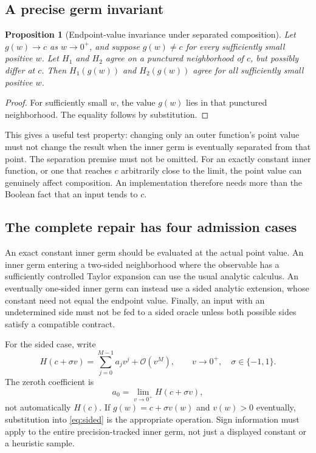 \documentclass[11pt,letterpaper]{article}
\newcommand{\OO}{\mathcal{O}}
\newtheorem{proposition}{Proposition}[section]
\begin{document}
\subsection{A precise germ invariant}
\begin{proposition}[Endpoint-value invariance under separated composition]
Let $g(w)\to c$ as $w\to0^+$, and suppose $g(w)\ne c$ for every sufficiently
small positive $w$. Let $H_1$ and $H_2$ agree on a punctured neighborhood of $c$,
but possibly differ at $c$. Then $H_1(g(w))$ and $H_2(g(w))$ agree for all
sufficiently small positive $w$.
\end{proposition}
\begin{proof}
For sufficiently small $w$, the value $g(w)$ lies in that punctured neighborhood.
The equality follows by substitution.\end{proof}

This gives a useful test property: changing only an outer function's point
value must not change the result when the inner germ is eventually separated
from that point. The separation premise must not be omitted. For an exactly
constant inner function, or one that reaches $c$ arbitrarily close to the limit,
the point value can genuinely affect composition. An implementation therefore
needs more than the Boolean fact that an input tends to $c$.

\subsection{The complete repair has four admission cases}
An exact constant inner germ should be evaluated at the actual point value.
An inner germ entering a two-sided neighborhood where the observable has a
sufficiently controlled Taylor expansion can use the usual analytic calculus.
An eventually one-sided inner germ can instead use a sided analytic extension,
whose constant need not equal the endpoint value. Finally, an input with an
undetermined side must not be fed to a sided oracle unless both possible sides
satisfy a compatible contract.

For the sided case, write
\begin{equation}\label{eq:sided}
 H(c+\sigma v)=\sum_{j=0}^{M-1}a_j v^j+\OO(v^M),
 \qquad v\to0^+,\quad\sigma\in\{-1,1\}.
\end{equation}
The zeroth coefficient is
\begin{equation}
 a_0=\lim_{v\to0^+}H(c+\sigma v),
\end{equation}
not automatically $H(c)$. If $g(w)=c+\sigma v(w)$ and $v(w)>0$ eventually,
substitution into \eqref{eq:sided} is the appropriate operation. Sign information
must apply to the entire precision-tracked inner germ, not just a displayed
constant or a heuristic sample.
\end{document}
